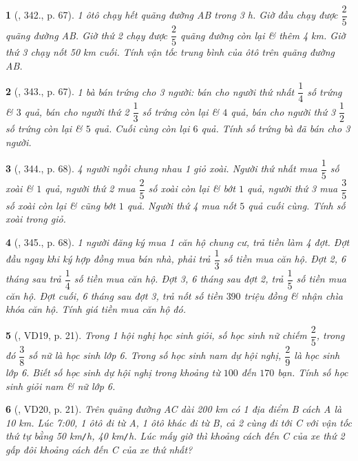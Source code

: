 \documentclass{article}
\newtheorem{baitoan}{}
\begin{document}
\begin{baitoan}[\cite{Tuyen_Toan_6}, 342., p. 67]
	1 ôtô chạy hết quãng đường AB trong {\rm3 h}. Giờ đầu chạy được $\dfrac{2}{5}$ quãng đường AB. Giờ thứ 2 chạy được $\dfrac{2}{5}$ quãng đường còn lại \& thêm {\rm4 km}. Giờ thứ 3 chạy nốt {\rm50 km} cuối. Tính vận tốc trung bình của ôtô trên quãng đường AB.
\end{baitoan}

\begin{baitoan}[\cite{Tuyen_Toan_6}, 343., p. 67]
	1 bà bán trứng cho 3 người: bán cho người thứ nhất $\dfrac{1}{4}$ số trứng \& $3$ quả, bán cho người thứ 2 $\dfrac{1}{3}$ số trứng còn lại \& $4$ quả, bán cho người thứ 3 $\dfrac{1}{2}$ số trứng còn lại \& $5$ quả. Cuối cùng còn lại $6$ quả. Tính số trứng bà đã bán cho 3 người.
\end{baitoan}

\begin{baitoan}[\cite{Tuyen_Toan_6}, 344., p. 68]
	4 người ngồi chung nhau 1 giỏ xoài. Người thứ nhất mua $\dfrac{1}{5}$ số xoài \& $1$ quả, người thứ 2 mua $\dfrac{2}{5}$ số xoài còn lại \& bớt $1$ quả, người thứ 3 mua $\dfrac{3}{5}$ số xoài còn lại \& cũng bớt $1$ quả. Người thứ 4 mua nốt $5$ quả cuối cùng. Tính số xoài trong giỏ.
\end{baitoan}

\begin{baitoan}[\cite{Tuyen_Toan_6}, 345., p. 68]
	1 người đăng ký mua 1 căn hộ chung cư, trả tiền làm 4 đợt. Đợt đầu ngay khi ký hợp đồng mua bán nhà, phải trả $\dfrac{1}{3}$ số tiền mua căn hộ. Đợt 2, 6 tháng sau trả $\dfrac{1}{4}$ số tiền mua căn hộ. Đợt 3, 6 tháng sau đợt 2, trả $\dfrac{1}{5}$ số tiền mua căn hộ. Đợt cuối, 6 tháng sau đợt 3, trả nốt số tiền $390$ triệu đồng \& nhận chìa khóa căn hộ. Tính giá tiền mua căn hộ đó.
\end{baitoan}

\begin{baitoan}[\cite{Binh_Toan_6_tap_2}, VD19, p. 21]
	Trong 1 hội nghị học sinh giỏi, số học sinh nữ chiếm $\dfrac{2}{5}$, trong đó $\dfrac{3}{8}$ số nữ là học sinh lớp 6. Trong số học sinh nam dự hội nghị, $\dfrac{2}{9}$ là học sinh lớp 6. Biết số học sinh dự hội nghị trong khoảng từ $100$ đến $170$ bạn. Tính số học sinh giỏi nam \& nữ lớp 6.
\end{baitoan}

\begin{baitoan}[\cite{Binh_Toan_6_tap_2}, VD20, p. 21]
	Trên quãng đường AC dài {\rm200 km} có 1 địa điểm B cách A là {\rm10 km}. Lúc {\rm7:00}, 1 ôtô đi từ A, 1 ôtô khác đi từ B, cả 2 cùng đi tới C với vận tốc thứ tự bằng {\rm50 km{\tt/}h, 40 km{\tt/}h}. Lúc mấy giờ thì khoảng cách đến C của xe thứ 2 gấp đôi khoảng cách đến C của xe thứ nhất?
\end{baitoan}
\end{document}
